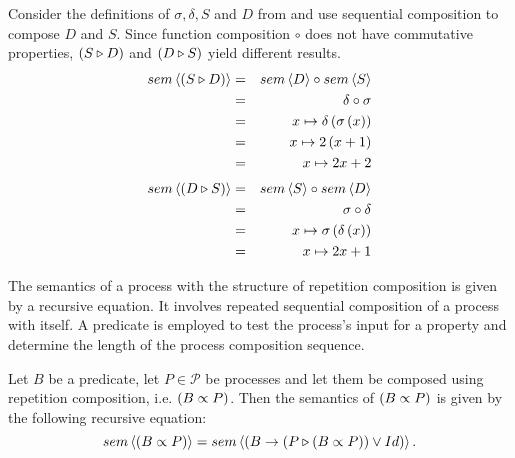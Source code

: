 \begin{example}
\label{exp:sem_sequence}
Consider the definitions of $\sigma, \delta, S$ and $D$ from  and use sequential composition to compose $D$ and $S$. Since function composition $\circ$ does not have commutative properties, $\left( S \triangleright D \right)$ and $\left( D \triangleright S \right)$ yield different results.
  \begin{eqnarray*}
    sem \left\langle \left( S \triangleright D \right) \right\rangle & = & sem \left\langle D \right\rangle \circ sem \left\langle S \right\rangle \\
                          & = & \delta \circ \sigma \\
                          & = & x \mapsto \delta \left( \sigma \left( x \right) \right) \\
                          & = & x \mapsto 2 \left( x+1 \right) \\
                          & = & x \mapsto 2x+2
  \end{eqnarray*}
  \begin{eqnarray*}
    sem \left\langle \left( D \triangleright S \right) \right\rangle & = & sem \left\langle S \right\rangle \circ sem \left\langle D \right\rangle \\
                          & = & \sigma \circ \delta \\
                          & = & x \mapsto \sigma \left( \delta \left( x \right) \right) \\
                          & = & x \mapsto 2x + 1
  \end{eqnarray*}
\end{example}


The semantics of a process with the structure of repetition composition is given by a recursive equation. It involves repeated sequential composition of a process with itself. A predicate is employed to test the process's input for a property and determine the length of the process composition sequence.
\begin{definition}
\label{def:sem_repetition}
Let $B$ be a predicate, let $P \in \mathcal{P}$ be processes and let them be composed using repetition composition, i.e. $\left( B \propto P \right)$. Then the semantics of $\left( B \propto P \right)$ is given by the following recursive equation:
  \begin{equation*}
    \label{eqn_sem_repetition}
    sem \left\langle \left( B \propto P \right) \right\rangle = sem \left\langle \left( B \to \left( P \triangleright \left( B \propto P \right) \right) \vee Id \right) \right\rangle.
  \end{equation*}
  \hfill\qedsymbol
\end{definition}

